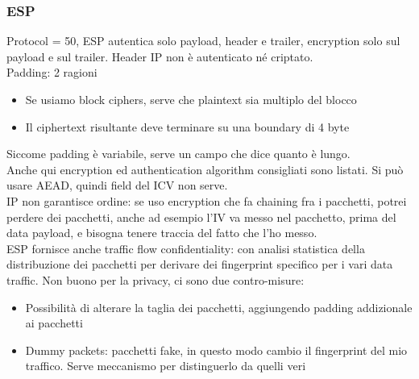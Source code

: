 \documentclass[16px]{article}
\begin{document}
\subsubsection{ESP}
Protocol = 50, ESP autentica solo payload, header e trailer, encryption solo sul payload e sul trailer. Header IP non è autenticato né criptato.\\ Padding: 2 ragioni
\begin{itemize}
\item Se usiamo block ciphers, serve che plaintext sia multiplo del blocco
\item Il ciphertext risultante deve terminare su una boundary di 4 byte
\end{itemize}
Siccome padding è variabile, serve un campo che dice quanto è lungo.\\ Anche qui encryption ed authentication algorithm consigliati sono listati. Si può usare AEAD, quindi field del ICV non serve.\\ IP non garantisce ordine: se uso encryption che fa chaining fra i pacchetti, potrei perdere dei pacchetti, anche ad esempio l'IV va messo nel pacchetto, prima del data payload, e bisogna tenere traccia del fatto che l'ho messo.\\ ESP fornisce anche traffic flow confidentiality: con analisi statistica della distribuzione dei pacchetti per derivare dei fingerprint specifico per i vari data traffic. Non buono per la privacy, ci sono due contro-misure:
\begin{itemize}
\item Possibilità di alterare la taglia dei pacchetti, aggiungendo padding addizionale ai pacchetti
\item Dummy packets: pacchetti fake, in questo modo cambio il fingerprint del mio traffico. Serve meccanismo per distinguerlo da quelli veri
\end{itemize}
\end{document}
